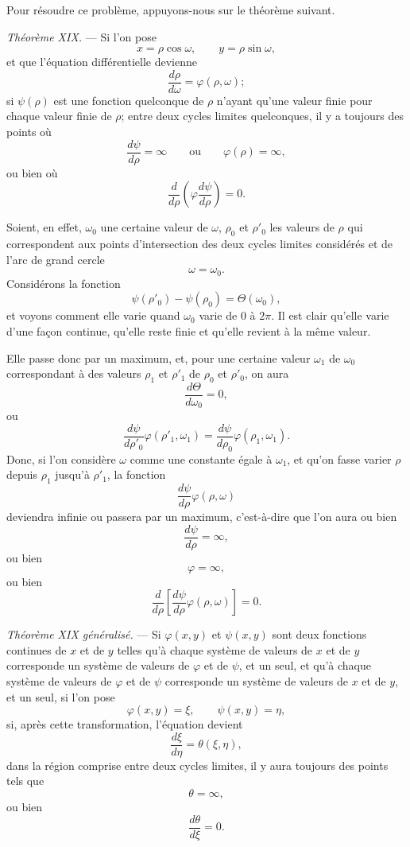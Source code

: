 \documentclass[11pt]{article}
\begin{document}
Pour résoudre ce problème, appuyons-nous sur le théorème suivant.

\emph{Théorème XIX.} --- Si l’on pose
\[
x=\rho\cos\omega,
\qquad
 y=\rho\sin\omega,
\]
et que l’équation différentielle devienne
\[
\frac{d\rho}{d\omega}=\varphi(\rho,\omega);
\]
si $\psi(\rho)$ est une fonction quelconque de $\rho$ n’ayant qu’une valeur finie pour chaque valeur finie de $\rho$; entre deux cycles limites quelconques, il y a toujours des points où
\[
\frac{d\psi}{d\rho}=\infty
\qquad\text{ou}\qquad
\varphi(\rho)=\infty,
\]
ou bien où
\[
\frac{d}{d\rho}\left(\varphi\frac{d\psi}{d\rho}\right)=0.
\]

Soient, en effet, $\omega_0$ une certaine valeur de $\omega$, $\rho_0$ et $\rho'_0$ les valeurs de $\rho$ qui correspondent aux points d’intersection des deux cycles limites considérés et de l’arc de grand cercle
\[
\omega=\omega_0.
\]
Considérons la fonction
\[
\psi(\rho'_0)-\psi(\rho_0)=\Theta(\omega_0),
\]
et voyons comment elle varie quand $\omega_0$ varie de 0 à $2\pi$. Il est clair qu’elle varie d’une façon continue, qu’elle reste finie et qu’elle revient à la même valeur.

Elle passe donc par un maximum, et, pour une certaine valeur $\omega_1$ de $\omega_0$ correspondant à des valeurs $\rho_1$ et $\rho'_1$ de $\rho_0$ et $\rho'_0$, on aura
\[
\frac{d\Theta}{d\omega_0}=0,
\]
ou
\[
\frac{d\psi}{d\rho'_0}\varphi(\rho'_1,\omega_1)=\frac{d\psi}{d\rho_0}\varphi(\rho_1,\omega_1).
\]
Donc, si l’on considère $\omega$ comme une constante égale à $\omega_1$, et qu’on fasse varier $\rho$ depuis $\rho_1$ jusqu’à $\rho'_1$, la fonction
\[
\frac{d\psi}{d\rho}\varphi(\rho,\omega)
\]
deviendra infinie ou passera par un maximum, c’est-à-dire que l’on aura ou bien
\[
\frac{d\psi}{d\rho}=\infty,
\]
ou bien
\[
\varphi=\infty,
\]
ou bien
\[
\frac{d}{d\rho}\left[\frac{d\psi}{d\rho}\varphi(\rho,\omega)\right]=0.
\]

\emph{Théorème XIX généralisé.} --- Si $\varphi(x,y)$ et $\psi(x,y)$ sont deux fonctions continues de $x$ et de $y$ telles qu’à chaque système de valeurs de $x$ et de $y$ corresponde un système de valeurs de $\varphi$ et de $\psi$, et un seul, et qu’à chaque système de valeurs de $\varphi$ et de $\psi$ corresponde un système de valeurs de $x$ et de $y$, et un seul,
si l’on pose
\[
\varphi(x,y)=\xi,
\qquad
\psi(x,y)=\eta,
\]
si, après cette transformation, l’équation devient
\[
\frac{d\xi}{d\eta}=\theta(\xi,\eta),
\]
dans la région comprise entre deux cycles limites, il y aura toujours des points tels que
\[
\theta=\infty,
\]
ou bien
\[
\frac{d\theta}{d\xi}=0.
\]
\end{document}
